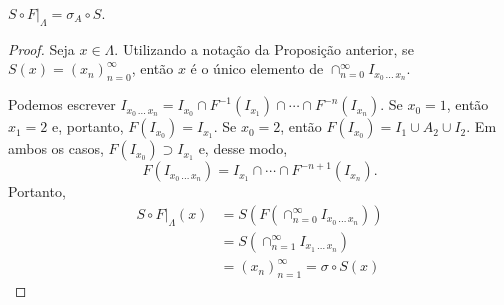 \begin{theorem}
$S \circ F|_\Lambda = \sigma_A \circ S$.
\end{theorem}


\begin{proof}
Seja $x \in \Lambda$. Utilizando a notação da Proposição anterior, se $S(x) = (x_n)_{n=0}^\infty$, então $x$ é o único elemento de $\cap_{n=0}^\infty I_{x_0 \, \dots \, x_n}$.

Podemos escrever $I_{x_0 \, \dots \, x_n} = I_{x_0} \cap F^{-1}(I_{x_1}) \cap \cdots \cap F^{-n}(I_{x_n})$. Se $x_0 = 1$, então $x_1 = 2$ e, portanto, $F(I_{x_0}) = I_{x_1}$. Se $x_0 = 2$, então $F(I_{x_0}) = I_1 \cup A_2 \cup I_2$. Em ambos os casos, $F(I_{x_0}) \supset I_{x_1}$ e, desse modo,
$$F(I_{x_0 \, \dots \, x_n}) = I_{x_1} \cap \cdots \cap F^{-n+1}(I_{x_n}).$$
Portanto,
\begin{align*}
S \circ F|_{\Lambda}(x) & = S(F(\cap_{n=0}^\infty I_{x_0 \, \dots \, x_n})) \\
& = S(\cap_{n=1}^\infty I_{x_1 \, \dots \, x_n}) \\
& = (x_n)_{n=1}^\infty  = \sigma \circ S(x)
\end{align*}
\end{proof}
